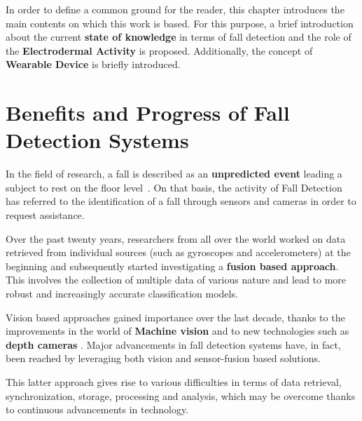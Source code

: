 \label{ch:background}

In order to define a common ground for the reader, this chapter introduces the main contents on which this work is based. For this purpose, a brief introduction about the current \textbf{state of knowledge} in terms of fall detection and the role of the \textbf{Electrodermal Activity} is proposed. Additionally, the concept of \textbf{Wearable Device} is briefly introduced.

\section{Benefits and Progress of Fall Detection Systems }\label{sec:fallintro}

In the field of research, a fall is described as an \textbf{unpredicted event} leading a subject to rest on the floor level~\cite{Lamb1}. On that basis, the activity of Fall Detection has referred to the identification of a fall through sensors and cameras in order to request assistance.

Over the past twenty years, researchers from all over the world worked on data retrieved from individual sources (such as gyroscopes and accelerometers) at the beginning and subsequently started investigating a \textbf{fusion based approach}. This involves the collection of multiple data of various nature and lead to more robust and increasingly accurate classification models. 

Vision based approaches gained importance over the last decade, thanks to the improvements in the world of \textbf{Machine vision} and to new technologies such as \textbf{depth cameras} \cite{elderlySurvey}. Major advancements in fall detection systems have, in fact, been reached by leveraging both vision and sensor-fusion based solutions. 

This latter approach gives rise to various difficulties in terms of data retrieval, synchronization, storage, processing and analysis, which may be overcome thanks to continuous advancements in technology.


